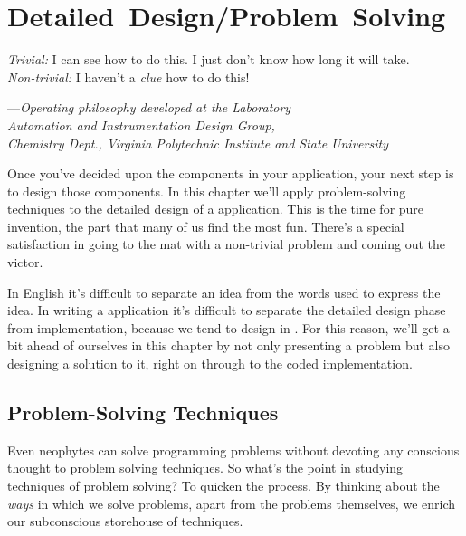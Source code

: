 
\chapter{Detailed~Design/\allowhyphens Problem~Solving}
%
%
\begin{tfquot}
\emph{Trivial:} I can see how to do this. I just don't know how long it
will take.\\
\emph{Non-trivial:} I haven't a \emph{clue} how to do this!

\begin{flushright}
---\emph{Operating philosophy developed at the Laboratory\\
Automation and Instrumentation Design Group,\\
Chemistry Dept., Virginia Polytechnic Institute and State University}
\end{flushright}
\end{tfquot}
\initial Once you've decided upon the components in your application, your next
step is to design those components. In this chapter we'll apply
problem-solving techniques to the detailed design of a \Forth{}
application.  This is the time for pure invention, the part that many of
us find the most fun. There's a special satisfaction in going to the mat
with a non-trivial problem and coming out the victor.

In English it's difficult to separate an idea from the words used to
express the idea. In writing a \Forth{} application it's difficult to
separate the detailed design phase from implementation, because we tend to
design in \Forth{}. For this reason, we'll get a bit ahead of ourselves in
this chapter by not only presenting a problem but also designing a
solution to it, right on through to the coded implementation.

\section{Problem-Solving Techniques}%
%

Even neophytes can solve programming problems without devoting any
conscious thought to problem solving techniques. So what's the point in
studying techniques of problem solving? To quicken the process. By
thinking about the \emph{ways} in which we solve problems, apart from
the problems themselves, we enrich our subconscious storehouse of
techniques.

